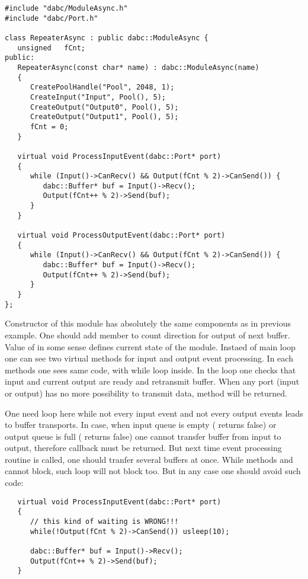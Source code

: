\begin{small}
\begin{verbatim}
#include "dabc/ModuleAsync.h"
#include "dabc/Port.h"

class RepeaterAsync : public dabc::ModuleAsync {
   unsigned   fCnt;
public:
   RepeaterAsync(const char* name) : dabc::ModuleAsync(name)
   {
      CreatePoolHandle("Pool", 2048, 1);
      CreateInput("Input", Pool(), 5);
      CreateOutput("Output0", Pool(), 5);
      CreateOutput("Output1", Pool(), 5);
      fCnt = 0;
   }
    
   virtual void ProcessInputEvent(dabc::Port* port) 
   {
      while (Input()->CanRecv() && Output(fCnt % 2)->CanSend()) {
         dabc::Buffer* buf = Input()->Recv();
         Output(fCnt++ % 2)->Send(buf);
      }
   }

   virtual void ProcessOutputEvent(dabc::Port* port) 
   {
      while (Input()->CanRecv() && Output(fCnt % 2)->CanSend()) {
         dabc::Buffer* buf = Input()->Recv();
         Output(fCnt++ % 2)->Send(buf);
      }
   }
};
\end{verbatim}
\end{small}

Constructor of this module has absolutely the same components as in previous example.
One should add  member to count direction for output of next buffer.
Value of  in some sense defines current state of the module. 
 Instaed of main loop one can see two virtual methods for input and output event
processing. In each methods one sees same code, with while loop inside.
In the loop one checks that input and current output are ready and retransmit buffer.
When any port (input or output) has no more possibility to transmit data, 
method will be returned. 

One need  loop here while not every input event and not every output events
leads to buffer transports. In case, when input queue is empty ( returns false) 
or output queue is full ( returns false) one cannot transfer buffer from input
to output, therefore callback must be returned. But next time event processing routine is
called, one should tranfer several buffers at once. While methods  and   
cannot block, such  loop will not block too. But in any case one should 
avoid such  code:

\begin{small}
\begin{verbatim}
   virtual void ProcessInputEvent(dabc::Port* port) 
   {
      // this kind of waiting is WRONG!!!
      while(!Output(fCnt % 2)->CanSend()) usleep(10);
   
      dabc::Buffer* buf = Input()->Recv();
      Output(fCnt++ % 2)->Send(buf);
   }

\end{verbatim}
\end{small}

